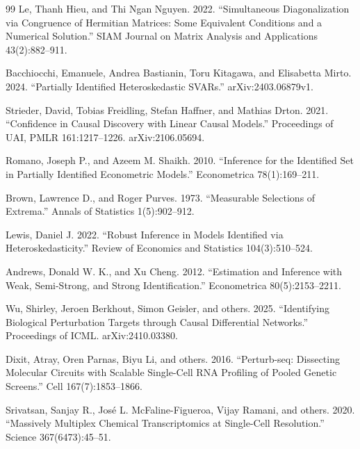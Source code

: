 \documentclass{article}
\begin{document}
\begin{thebibliography}{99}
   Le, Thanh Hieu, and Thi Ngan Nguyen. 2022. ``Simultaneous Diagonalization via Congruence of Hermitian Matrices: Some Equivalent Conditions and a Numerical Solution.'' SIAM Journal on Matrix Analysis and Applications 43(2):882--911.

   Bacchiocchi, Emanuele, Andrea Bastianin, Toru Kitagawa, and Elisabetta Mirto. 2024. ``Partially Identified Heteroskedastic SVARs.'' arXiv:2403.06879v1.

   Strieder, David, Tobias Freidling, Stefan Haffner, and Mathias Drton. 2021. ``Confidence in Causal Discovery with Linear Causal Models.'' Proceedings of UAI, PMLR 161:1217--1226. arXiv:2106.05694.

   Romano, Joseph P., and Azeem M. Shaikh. 2010. ``Inference for the Identified Set in Partially Identified Econometric Models.'' Econometrica 78(1):169--211.

   Brown, Lawrence D., and Roger Purves. 1973. ``Measurable Selections of Extrema.'' Annals of Statistics 1(5):902--912.

   Lewis, Daniel J. 2022. ``Robust Inference in Models Identified via Heteroskedasticity.'' Review of Economics and Statistics 104(3):510--524.

   Andrews, Donald W. K., and Xu Cheng. 2012. ``Estimation and Inference with Weak, Semi-Strong, and Strong Identification.'' Econometrica 80(5):2153--2211.

   Wu, Shirley, Jeroen Berkhout, Simon Geisler, and others. 2025. ``Identifying Biological Perturbation Targets through Causal Differential Networks.'' Proceedings of ICML. arXiv:2410.03380.

   Dixit, Atray, Oren Parnas, Biyu Li, and others. 2016. ``Perturb-seq: Dissecting Molecular Circuits with Scalable Single-Cell RNA Profiling of Pooled Genetic Screens.'' Cell 167(7):1853--1866.

   Srivatsan, Sanjay R., José L. McFaline-Figueroa, Vijay Ramani, and others. 2020. ``Massively Multiplex Chemical Transcriptomics at Single-Cell Resolution.'' Science 367(6473):45--51.

\end{thebibliography}
\end{document}
